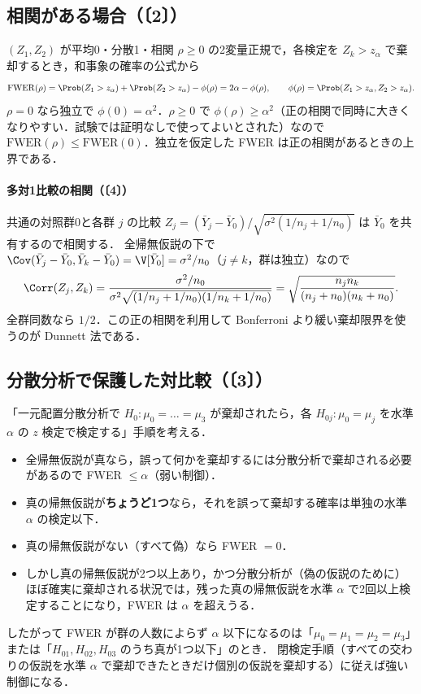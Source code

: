 \subsection{相関がある場合（〔2〕）}
$(Z_1,Z_2)$ が平均0・分散1・相関 $\rho\ge0$ の2変量正規で，各検定を $Z_k>z_\alpha$ で棄却するとき，和事象の確率の公式から
\[
\mathrm{FWER}(\rho)=\Prob(Z_1>z_\alpha)+\Prob(Z_2>z_\alpha)-\phi(\rho)=2\alpha-\phi(\rho),\qquad\phi(\rho)=\Prob(Z_1>z_\alpha,Z_2>z_\alpha).
\]
$\rho=0$ なら独立で $\phi(0)=\alpha^2$．$\rho\ge0$ で $\phi(\rho)\ge\alpha^2$（正の相関で同時に大きくなりやすい．試験では証明なしで使ってよいとされた）なので
$\mathrm{FWER}(\rho)\le\mathrm{FWER}(0)$．独立を仮定した FWER は正の相関があるときの上界である．
\paragraph{多対1比較の相関（〔4〕）}
共通の対照群0と各群 $j$ の比較 $Z_j=(\bar Y_j-\bar Y_0)/\sqrt{\sigma^2(1/n_j+1/n_0)}$ は $\bar Y_0$ を共有するので相関する．
全帰無仮説の下で $\Cov(\bar Y_j-\bar Y_0,\bar Y_k-\bar Y_0)=\V[\bar Y_0]=\sigma^2/n_0$（$j\ne k$，群は独立）なので
\[
\Corr(Z_j,Z_k)=\frac{\sigma^2/n_0}{\sigma^2\sqrt{(1/n_j+1/n_0)(1/n_k+1/n_0)}}=\sqrt{\frac{n_jn_k}{(n_j+n_0)(n_k+n_0)}} .
\]
全群同数なら $1/2$．この正の相関を利用して Bonferroni より緩い棄却限界を使うのが Dunnett 法である．

\subsection{分散分析で保護した対比較（〔3〕）}
「一元配置分散分析で $H_0:\mu_0=\dots=\mu_3$ が棄却されたら，各 $H_{0j}:\mu_0=\mu_j$ を水準 $\alpha$ の $z$ 検定で検定する」手順を考える．
\begin{itemize}
\item 全帰無仮説が真なら，誤って何かを棄却するには分散分析で棄却される必要があるので FWER $\le\alpha$（弱い制御）．
\item 真の帰無仮説が\textbf{ちょうど1つ}なら，それを誤って棄却する確率は単独の水準 $\alpha$ の検定以下．
\item 真の帰無仮説がない（すべて偽）なら FWER $=0$．
\item しかし真の帰無仮説が2つ以上あり，かつ分散分析が（偽の仮説のために）ほぼ確実に棄却される状況では，残った真の帰無仮説を水準 $\alpha$ で2回以上検定することになり，FWER は $\alpha$ を超えうる．
\end{itemize}
したがって FWER が群の人数によらず $\alpha$ 以下になるのは「$\mu_0=\mu_1=\mu_2=\mu_3$」または「$H_{01},H_{02},H_{03}$ のうち真が1つ以下」のとき．
閉検定手順（すべての交わりの仮説を水準 $\alpha$ で棄却できたときだけ個別の仮説を棄却する）に従えば強い制御になる．

